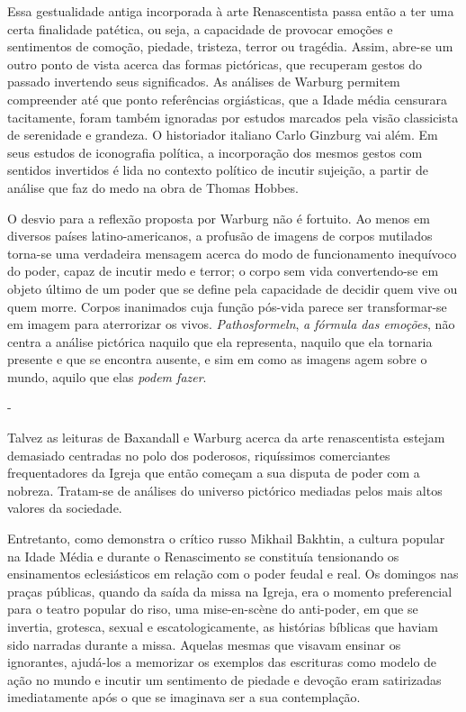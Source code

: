 Essa gestualidade antiga incorporada à arte Renascentista passa então a
ter uma certa finalidade patética, ou seja, a capacidade de provocar
emoções e sentimentos de comoção, piedade, tristeza, terror ou tragédia.
Assim, abre-se um outro ponto de vista acerca das formas pictóricas, que
recuperam gestos do passado invertendo seus significados. As análises de
Warburg permitem compreender até que ponto referências orgiásticas, que
a Idade média censurara tacitamente, foram também ignoradas por estudos
marcados pela visão classicista de serenidade e grandeza. O historiador
italiano Carlo Ginzburg vai além. Em seus estudos de iconografia
política, a incorporação dos mesmos gestos com sentidos invertidos é
lida no contexto político de incutir sujeição, a partir de análise que
faz do medo na obra de Thomas Hobbes.

O desvio para a reflexão proposta por Warburg não é fortuito. Ao menos
em diversos países latino-americanos, a profusão de imagens de corpos
mutilados torna-se uma verdadeira mensagem acerca do modo de
funcionamento inequívoco do poder, capaz de incutir medo e terror; o
corpo sem vida convertendo-se em objeto último de um poder que se define
pela capacidade de decidir quem vive ou quem morre. Corpos inanimados
cuja função pós-vida parece ser transformar-se em imagem para
aterrorizar os vivos. \emph{Pathosformeln}, \emph{a fórmula das
emoções}, não centra a análise pictórica naquilo que ela representa,
naquilo que ela tornaria presente e que se encontra ausente, e sim em
como as imagens agem sobre o mundo, aquilo que elas \emph{podem fazer}.

-

Talvez as leituras de Baxandall e Warburg acerca da arte renascentista
estejam demasiado centradas no polo dos poderosos, riquíssimos
comerciantes frequentadores da Igreja que então começam a sua disputa de
poder com a nobreza. Tratam-se de análises do universo pictórico
mediadas pelos mais altos valores da sociedade.

Entretanto, como demonstra o crítico russo Mikhail Bakhtin, a cultura
popular na Idade Média e durante o Renascimento se constituía
tensionando os ensinamentos eclesiásticos em relação com o poder feudal
e real. Os domingos nas praças públicas, quando da saída da missa na
Igreja, era o momento preferencial para o teatro popular do riso, uma
mise-en-scène do anti-poder, em que se invertia, grotesca, sexual e
escatologicamente, as histórias bíblicas que haviam sido narradas
durante a missa. Aquelas mesmas que visavam ensinar os ignorantes,
ajudá-los a memorizar os exemplos das escrituras como modelo de ação no
mundo e incutir um sentimento de piedade e devoção eram satirizadas
imediatamente após o que se imaginava ser a sua contemplação.

